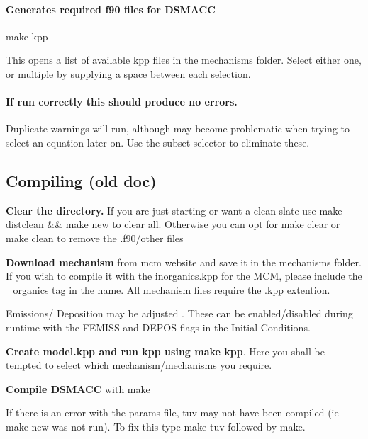 \paragraph*{Generates required f90 files for D\+S\+M\+A\+CC}


\begin{DoxyCode}
make kpp
\end{DoxyCode}
 This opens a list of available kpp files in the mechanisms folder. Select either one, or multiple by supplying a space between each selection.



\paragraph*{If run correctly this should produce no errors.}

Duplicate warnings will run, although may become problematic when trying to select an equation later on. Use the subset selector to eliminate these.



\subsection*{Compiling (old doc)}


\begin{DoxyEnumerate}
\item {\bfseries Clear the directory.} If you are just starting or want a clean slate use {\ttfamily make distclean \&\& make new} to clear all. Otherwise you can opt for {\ttfamily make clear or make clean} to remove the .f90/other files
\item {\bfseries Download mechanism} from mcm website and save it in the mechanisms folder. If you wish to compile it with the inorganics.\+kpp for the M\+CM, please include the {\ttfamily \+\_\+organics} tag in the name. All mechanism files require the {\ttfamily .kpp} extention.
\item Emissions/ Deposition may be adjusted . These can be enabled/disabled during runtime with the F\+E\+M\+I\+SS and D\+E\+P\+OS flags in the Initial Conditions.
\item {\bfseries Create model.\+kpp and run kpp using {\ttfamily make kpp}}. Here you shall be tempted to select which mechanism/mechanisms you require.
\item {\bfseries Compile D\+S\+M\+A\+CC} with {\ttfamily make}
\end{DoxyEnumerate}
\begin{DoxyItemize}
\item If there is an error with the params file, tuv may not have been compiled (ie make new was not run). To fix this type {\ttfamily make tuv} followed by {\ttfamily make}. 
\end{DoxyItemize}